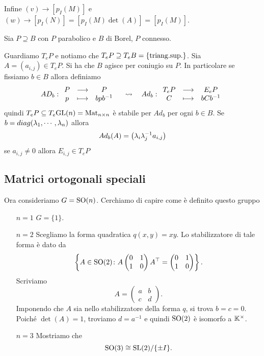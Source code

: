\begin{example}
Infine $(v)\longrightarrow [p_I(M)]$ e $(w)\longrightarrow [p_I(N)]=[p_I(M)\det (A)]=[p_I(M)]$.
\end{example}

\begin{example}[Parabolici di $\GL(n)$]
Sia $P\supseteq B$ con $P$ parabolico e $B$ di Borel, $P$ connesso.

Guardiamo $T_e P$ e notiamo che $T_e P\supseteq T_e B=\left\{{\text{triang.sup.}}\right\}$. Sia $A=(a_{i,j})\in T_e P$. Si ha che $B$ agisce per coniugio su $P$. In particolare se fissiamo $b\in B$ allora definiamo
\[AD_b:\begin{array}{ccc} {P} & \longrightarrow & {P}\\ {p} & \longmapsto & {bpb^{-1}} \end{array}\quad\leadsto\quad Ad_b:\begin{array}{ccc} {T_eP} & \longrightarrow & {E_eP}\\ {C} & \longmapsto & {bCb^{-1}} \end{array}\]
quindi $T_e P\subseteq T_e\mathrm{GL}(n)=\operatorname{Mat}_{n\times n}$ \`e stabile per $Ad_b$ per ogni $b\in B$. Se $b=diag(\lambda_1,\cdots,\lambda_n)$ allora
\[Ad_b(A)=\left({\lambda_i\lambda_j^{-1} a_{i,j}}\right)\]
se $a_{i,j}\neq 0$ allora $E_{i,j}\in T_eP$ 
\end{example}


\subsection{Matrici ortogonali speciali}

Ora consideriamo $G=\operatorname{SO}(n)$. Cerchiamo di capire come \`e definito questo gruppo
\setlength{\leftmargini}{0cm}
\begin{itemize}
\item[$\boxed{n=1}$] $G=\{1\}$.
\item[$\boxed{n=2}$] Scegliamo la forma quadratica $q(x,y)=xy$. Lo stabilizzatore di tale forma è dato da 
\[\left\{A\in \operatorname{SO}(2)\colon A \begin{pmatrix}
    0 & 1 \\ 1& 0
\end{pmatrix}A^\top=\begin{pmatrix}
    0 & 1 \\ 1& 0
\end{pmatrix}\right\}.\] 
Scriviamo 
\[A=\begin{pmatrix}
    a & b \\ c& d
\end{pmatrix}.\] 
Imponendo che $A$ sia nello stabilizzatore della forma $q$, si trova $b=c=0$. Poiché $\det(A)=1$, troviamo $d=a^{-1}$ e quindi $\operatorname{SO}(2)$ è isomorfo a $\mathbb{K}^\times$.
\item[$\boxed{n=3}$] Mostriamo che 
\[\operatorname{SO}(3)\cong \mathrm{SL}(2)/\{\pm I\}.\]
\end{itemize}
\setlength{\leftmargini}{0.5cm}

